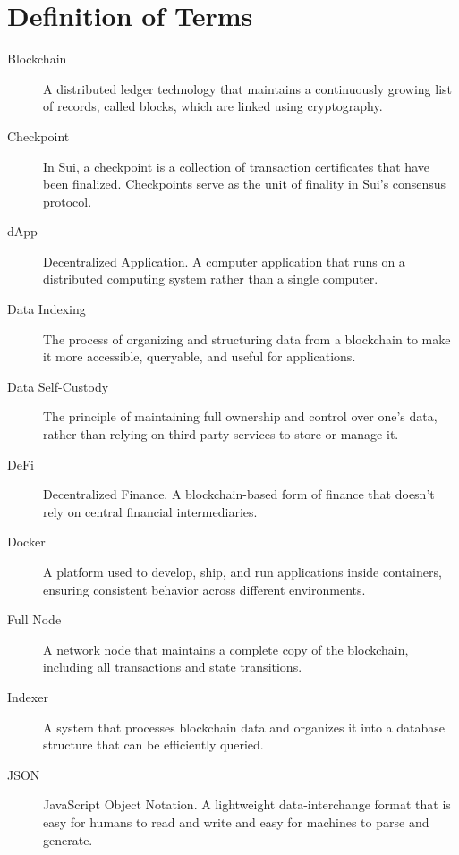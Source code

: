 \section*{Definition of Terms}

\begin{description}
    \item[Blockchain] A distributed ledger technology that maintains a continuously growing list of records, called blocks, which are linked using cryptography.
    
    \item[Checkpoint] In Sui, a checkpoint is a collection of transaction certificates that have been finalized. Checkpoints serve as the unit of finality in Sui's consensus protocol.
    
    \item[dApp] Decentralized Application. A computer application that runs on a distributed computing system rather than a single computer.
    
    \item[Data Indexing] The process of organizing and structuring data from a blockchain to make it more accessible, queryable, and useful for applications.
    
    \item[Data Self-Custody] The principle of maintaining full ownership and control over one's data, rather than relying on third-party services to store or manage it.
    
    \item[DeFi] Decentralized Finance. A blockchain-based form of finance that doesn't rely on central financial intermediaries.
    
    \item[Docker] A platform used to develop, ship, and run applications inside containers, ensuring consistent behavior across different environments.
    
    \item[Full Node] A network node that maintains a complete copy of the blockchain, including all transactions and state transitions.
    
    \item[Indexer] A system that processes blockchain data and organizes it into a database structure that can be efficiently queried.
    
    \item[JSON] JavaScript Object Notation. A lightweight data-interchange format that is easy for humans to read and write and easy for machines to parse and generate.
    

\end{description}
